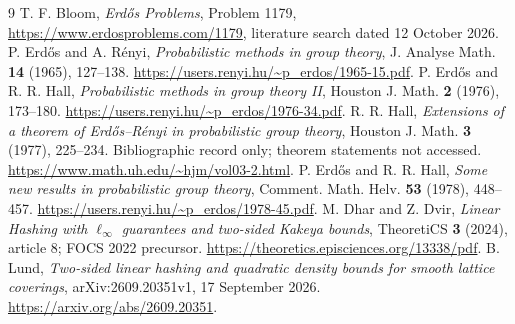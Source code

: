 \documentclass[11pt]{amsart}
\theoremstyle{remark}
\begin{document}
\begin{thebibliography}{9}
T. F. Bloom, \emph{Erd\H{o}s Problems}, Problem 1179,
\url{https://www.erdosproblems.com/1179}, literature search dated
12 October 2026.
P. Erd\H{o}s and A. R\'enyi, \emph{Probabilistic methods in group theory},
J. Analyse Math. \textbf{14} (1965), 127--138.
\url{https://users.renyi.hu/~p_erdos/1965-15.pdf}.
P. Erd\H{o}s and R. R. Hall, \emph{Probabilistic methods in group theory II},
Houston J. Math. \textbf{2} (1976), 173--180.
\url{https://users.renyi.hu/~p_erdos/1976-34.pdf}.
R. R. Hall, \emph{Extensions of a theorem of Erd\H{o}s--R\'enyi in
probabilistic group theory}, Houston J. Math. \textbf{3} (1977),
225--234. Bibliographic record only; theorem statements not accessed.
\url{https://www.math.uh.edu/~hjm/vol03-2.html}.
P. Erd\H{o}s and R. R. Hall, \emph{Some new results in probabilistic
group theory}, Comment. Math. Helv. \textbf{53} (1978), 448--457.
\url{https://users.renyi.hu/~p_erdos/1978-45.pdf}.
M. Dhar and Z. Dvir, \emph{Linear Hashing with $\ell_\infty$ guarantees
and two-sided Kakeya bounds}, TheoretiCS \textbf{3} (2024), article 8;
FOCS 2022 precursor.
\url{https://theoretics.episciences.org/13338/pdf}.
B. Lund, \emph{Two-sided linear hashing and quadratic density bounds
for smooth lattice coverings}, arXiv:2609.20351v1, 17 September 2026.
\url{https://arxiv.org/abs/2609.20351}.
\end{thebibliography}
\end{document}
